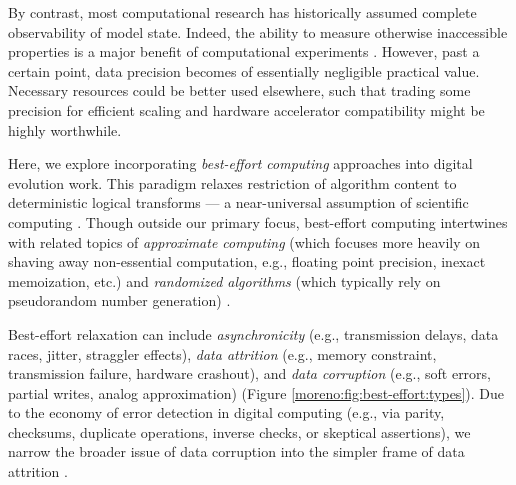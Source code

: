 By contrast, most computational research has historically assumed complete observability of model state.
Indeed, the ability to measure otherwise inaccessible properties is a major benefit of computational experiments \cite{lenski2003evolutionary}.
However, past a certain point, data precision becomes of essentially negligible practical value.
Necessary resources could be better used elsewhere, such that trading some precision for efficient scaling and hardware accelerator compatibility might be highly worthwhile.



Here, we explore incorporating \textit{best-effort computing} approaches into digital evolution work.
This paradigm relaxes restriction of algorithm content to deterministic logical transforms --- a near-universal assumption of scientific computing \cite{chakradhar2010best}.
Though outside our primary focus, best-effort computing intertwines with related topics of \textit{approximate computing} (which focuses more heavily on shaving away non-essential computation, e.g., floating point precision, inexact memoization, etc.) and \textit{randomized algorithms} (which typically rely on pseudorandom number generation) \cite{Buluc2021,mittal2016survey,menon2023approximate}.

Best-effort relaxation can include \textit{asynchronicity} (e.g., transmission delays, data races, jitter, straggler effects), \textit{data attrition} (e.g., memory constraint, transmission failure, hardware crashout), and \textit{data corruption} (e.g., soft errors, partial writes, analog approximation) (Figure \ref{moreno:fig:best-effort:types}).
Due to the economy of error detection in digital computing \cite{hamming1950error} (e.g., via parity, checksums, duplicate operations, inverse checks, or skeptical assertions), we narrow the broader issue of data corruption into the simpler frame of data attrition \cite{ackley2013beyond}.

